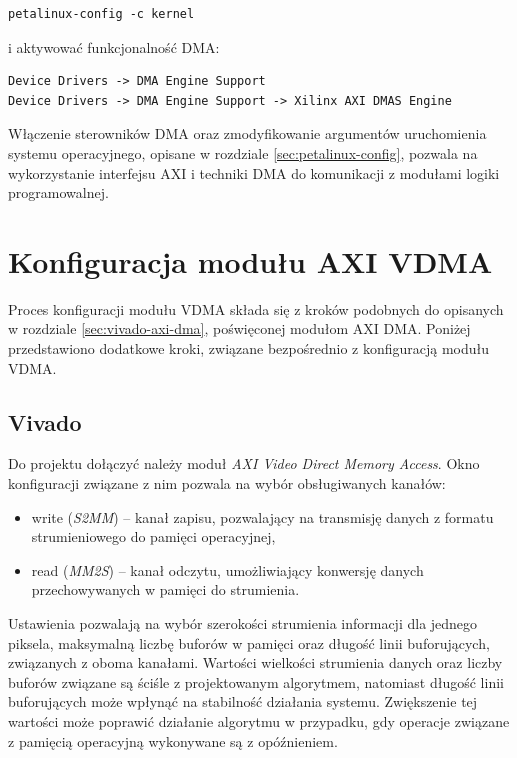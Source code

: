 \begin{lstlisting}[breaklines]
petalinux-config -c kernel
\end{lstlisting}

i aktywować funkcjonalność DMA:

\begin{lstlisting}[breaklines]
Device Drivers -> DMA Engine Support
Device Drivers -> DMA Engine Support -> Xilinx AXI DMAS Engine
\end{lstlisting}

Włączenie sterowników DMA oraz zmodyfikowanie argumentów uruchomienia systemu operacyjnego, opisane w rozdziale \ref{sec:petalinux-config}, pozwala na wykorzystanie interfejsu AXI i techniki DMA do komunikacji z modułami logiki programowalnej.



\section{Konfiguracja modułu AXI VDMA}
\label{sec:vivado-axi-vdma}

Proces konfiguracji modułu VDMA składa się z kroków podobnych do opisanych w rozdziale \ref{sec:vivado-axi-dma}, poświęconej modułom AXI DMA. Poniżej przedstawiono dodatkowe kroki, związane bezpośrednio z konfiguracją modułu VDMA.

\subsection{Vivado}
Do projektu dołączyć należy moduł \textit{AXI Video Direct Memory Access}. 
Okno konfiguracji związane z nim pozwala na wybór obsługiwanych kanałów:
\begin{itemize}
	\item write (\emph{S2MM}) -- kanał zapisu, pozwalający na transmisję danych z formatu strumieniowego do pamięci operacyjnej,
	\item read (\emph{MM2S}) -- kanał odczytu, umożliwiający konwersję danych przechowywanych w pamięci do strumienia.
\end{itemize}

Ustawienia pozwalają na wybór szerokości strumienia informacji dla jednego piksela, maksymalną liczbę buforów w pamięci oraz długość linii buforujących, związanych z oboma kanałami.
Wartości wielkości strumienia danych oraz liczby buforów związane są ściśle z projektowanym algorytmem, natomiast długość linii buforujących może wpłynąć na stabilność działania systemu. 
Zwiększenie tej wartości może poprawić działanie algorytmu w przypadku, gdy operacje związane z pamięcią operacyjną wykonywane są z opóźnieniem.


